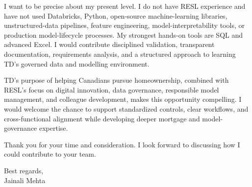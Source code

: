 \documentclass[letterpaper,10pt]{article}
\begin{document}
I want to be precise about my present level. I do not have RESL experience and have not used Databricks, Python, open-source machine-learning libraries, unstructured-data pipelines, feature engineering, model-interpretability tools, or production model-lifecycle processes. My strongest hands-on tools are SQL and advanced Excel. I would contribute disciplined validation, transparent documentation, requirements analysis, and a structured approach to learning TD's governed data and modelling environment.

TD's purpose of helping Canadians pursue homeownership, combined with RESL's focus on digital innovation, data governance, responsible model management, and colleague development, makes this opportunity compelling. I would welcome the chance to support standardized controls, clear workflows, and cross-functional alignment while developing deeper mortgage and model-governance expertise.

Thank you for your time and consideration. I look forward to discussing how I could contribute to your team.

Best regards,\\[8pt]
Jainali Mehta
\end{document}
